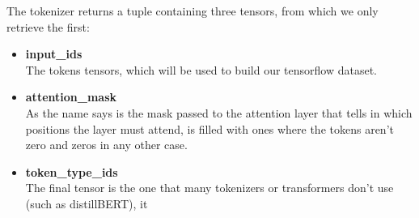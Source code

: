 The tokenizer returns a tuple containing three tensors, from which we only retrieve the first:
\begin{itemize}
    \item \textbf{input\_ids}\\
    The tokens tensors, which will be used to build our tensorflow dataset.
    \item \textbf{attention\_mask}\\
    As the name says is the mask passed to the attention layer that tells in which positions the layer must attend, is filled with ones where the tokens aren't zero and zeros in any other case.
    \item \textbf{token\_type\_ids}\\
    The final tensor is the one that many tokenizers or transformers don't use (such as distillBERT), it 
\end{itemize}
